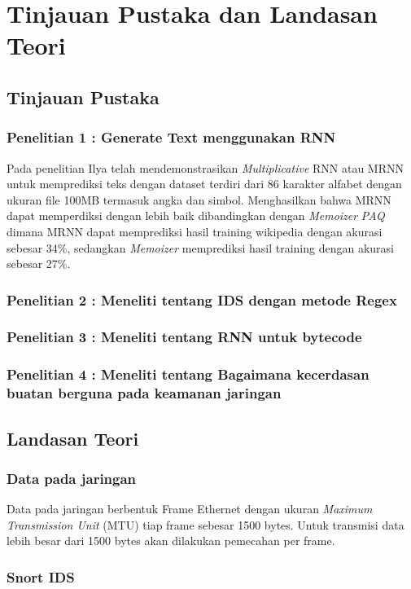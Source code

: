 \documentclass{report}
\begin{document}
\chapter{Tinjauan Pustaka dan Landasan Teori}
\section{Tinjauan Pustaka}
\subsection{Penelitian 1 : Generate Text menggunakan RNN}
Pada penelitian Ilya\cite{sutskever2011generating} telah mendemonstrasikan \textit{Multiplicative} RNN atau MRNN untuk memprediksi teks dengan dataset terdiri dari 86 karakter alfabet dengan ukuran file 100MB termasuk angka dan simbol.
Menghasilkan bahwa MRNN dapat memperdiksi dengan lebih baik dibandingkan dengan \textit{Memoizer} \textit{PAQ}
dimana MRNN dapat memprediksi hasil training wikipedia dengan akurasi sebesar 34\%, sedangkan \textit{Memoizer} memprediksi
hasil training dengan akurasi sebesar 27\%.
\subsection{Penelitian 2 : Meneliti tentang IDS dengan metode Regex}

\subsection{Penelitian 3 : Meneliti tentang RNN untuk bytecode}

\subsection{Penelitian 4 : Meneliti tentang Bagaimana kecerdasan buatan berguna pada keamanan jaringan}

\section{Landasan Teori}
\subsection{Data pada jaringan}
Data pada jaringan berbentuk Frame Ethernet dengan ukuran \textit{Maximum Transmission Unit} (MTU) tiap frame sebesar 1500 bytes. Untuk transmisi data lebih besar dari 1500 bytes akan dilakukan pemecahan per frame.
\subsection{Snort IDS}
\end{document}
